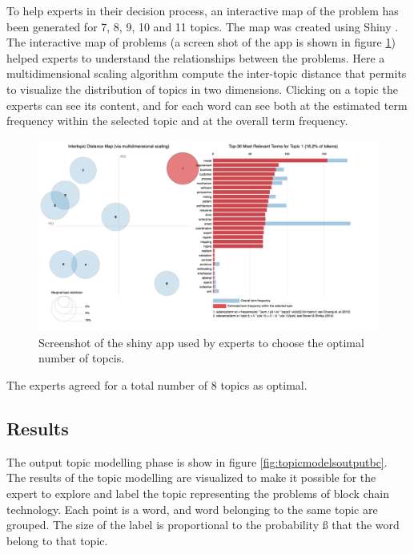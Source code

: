 \documentclass[b5paper,]{book}
\theoremstyle{definition}
\theoremstyle{definition}
\theoremstyle{definition}
\theoremstyle{remark}
\begin{document}
To help experts in their decision process, an interactive map of the
problem has been generated for 7, 8, 9, 10 and 11 topics. The map was
created using Shiny \citep{shiny2017}. The interactive map of problems
(a screen shot of the app is shown in figure
\ref{fig:topicmodelschinybc}) helped experts to understand the
relationships between the problems. Here a multidimensional scaling
algorithm compute the inter-topic distance that permits to visualize the
distribution of topics in two dimensions. Clicking on a topic the
experts can see its content, and for each word can see both at the
estimated term frequency within the selected topic and at the overall
term frequency.

\begin{figure}

{\centering \includegraphics[width=0.8\linewidth]{_bookdown_files/figures/bc_topicmodel_shiny} 

}

\caption{Screenshot of the shiny app used by experts to choose the optimal number of topcis. }\label{fig:topicmodelschinybc}
\end{figure}

The experts agreed for a total number of 8 topics as optimal.

\subsection{Results}\label{results-5}

The output topic modelling phase is show in figure
\ref{fig:topicmodelsoutputbc}. The results of the topic modelling are
visualized to make it possible for the expert to explore and label the
topic representing the problems of block chain technology. Each point is
a word, and word belonging to the same topic are grouped. The size of
the label is proportional to the probability ß that the word belong to
that topic.
\end{document}
